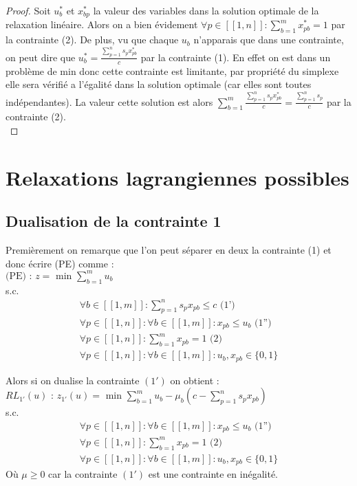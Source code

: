 \documentclass{article}
\begin{document}
\begin{proof}
Soit $u^*_b$ et $x^*_{bp}$ la valeur des variables dans la solution optimale de la relaxation linéaire. Alors on a bien évidement $\forall p \in [\![ 1 , n ]\!] : \sum \limits_{b = 1}^{m} x^*_{pb} = 1$ par la contrainte (2). De plus, vu que chaque $u_b$ n’apparais que dans une contrainte, on peut dire que $u^*_b = \frac{\sum \limits_{p=1}^n s_p x^*_{pb}}{c}$ par la contrainte (1). En effet on est dans un problème de min donc cette contrainte est limitante, par propriété du simplexe elle sera vérifié a l'égalité dans la solution optimale (car elles sont toutes indépendantes). La valeur cette solution est alors $\sum \limits_{b = 1}^m  \frac{\sum \limits_{p=1}^n s_p x^*_{pb}}{c} = \frac{\sum \limits_{p = 1}^n s_p}{c}$ par la contrainte (2).\\
\end{proof}

\section{Relaxations lagrangiennes possibles}

\subsection{Dualisation de la contrainte 1}
Premièrement on remarque que l'on peut séparer en deux la contrainte (1) et donc écrire (PE) comme : \\
$\text{(PE) : } z = \text{ min } \sum \limits_{b = 1 }^{m} u_b$\\
s.c.
\begin{align*}
 \forall b \in [\![ 1 , m ]\!] : \sum \limits_{p = 1}^{n} s_p x_{pb} \leqslant c \text{ (1')}\\
 \forall p \in [\![ 1 , n ]\!] : \forall b \in [\![ 1 , m ]\!] : x_{pb} \leqslant u_b \text{ (1'')}\\
 \forall p \in [\![ 1 , n ]\!] : \sum \limits_{b = 1}^{m} x_{pb} = 1 \text{ (2)}\\
 \forall p \in [\![ 1 , n ]\!] : \forall b \in [\![ 1 , m ]\!] : u_b , x_{pb} \in \{0,1\}
\end{align*}

Alors si on dualise la contrainte $(1')$ on obtient :\\
$RL_{1'}(u) \text{ : } z_{1'}(u) = \text{ min } \sum \limits_{b = 1}^{m} u_b - \mu_b (c - \sum \limits_{p = 1}^{n} s_p x_{pb} )$\\
s.c.
\begin{align*}
 \forall p \in [\![ 1 , n ]\!] : \forall b \in [\![ 1 , m ]\!] : x_{pb} \leqslant u_b \text{ (1'')}\\
 \forall p \in [\![ 1 , n ]\!] : \sum \limits_{b = 1}^{m} x_{pb} = 1 \text{ (2)}\\
 \forall p \in [\![ 1 , n ]\!] : \forall b \in [\![ 1 , m ]\!] : u_b , x_{pb} \in \{0,1\}
\end{align*}
Où $\mu \geqslant 0$ car la contrainte $(1')$ est une contrainte en inégalité.\\
\end{document}
